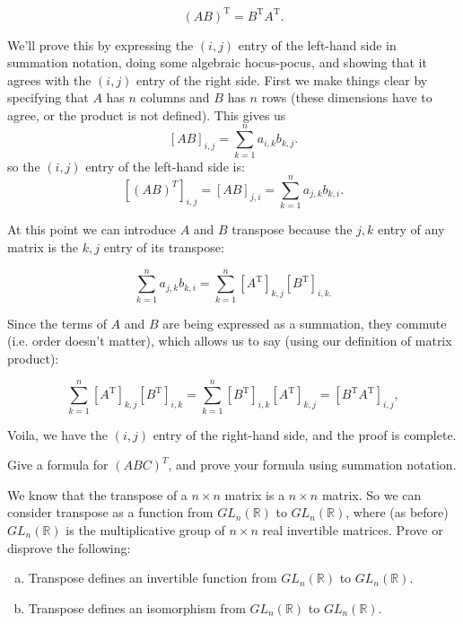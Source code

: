 \[ \left( {A}{B} \right)^{\text{T}} = {B}^{\text{T}} {A}^{\text{T}}. \]

We'll prove this by expressing the $(i,j)$ entry of the left-hand side in summation notation,  doing some algebraic hocus-pocus, and showing that it agrees with the $(i,j)$ entry of the right side.  First we make things clear by specifying that ${A}$ has $n$ columns and $B$ has $n$ rows (these dimensions have to agree, or the product is not defined). This gives us
\[ \left[ AB \right]_{i,j}= \sum_{k=1}^n a_{i,k} b_{k,j}. \]
so the $(i,j)$ entry of the left-hand side is:
 \[ \left[ (AB)^T \right]_{i,j} = \left[ AB \right]_{j,i} = \sum_{k=1}^n a_{j,k} b_{k,i}. \]

At this point we can introduce ${A}$ and ${B}$ transpose  because the $j,k$ entry of any matrix is the $k,j$ entry of its transpose:

\[  \sum_{k=1}^n a_{j,k} b_{k,i} =  \sum_{k=1}^n \left[A^{\text{T}}\right]_{k,j} \left[B^{\text{T}}\right]_{i,k.} \]

Since the terms of ${A}$ and ${B}$ are being expressed as a summation, they commute (i.e. order doesn't matter), which allows us to say (using our definition of matrix product):

\[ \sum_{k=1}^n \left[A^{\text{T}}\right]_{k,j} \left[B^{\text{T}}\right]_{i,k} = \sum_{k=1}^n \left[B^{\text{T}}\right]_{i,k}\left[A^{\text{T}}\right]_{k,j} = \left[ {B}^{\text{T}}{A}^{\text{T}} \right]_{i,j}, \]

Voila, we have the $(i,j)$ entry of the right-hand side, and the proof is complete.



\begin{exercise}{}
Give a formula for $(ABC)^T$, and prove your formula using summation notation.
\end{exercise}

\begin{exercise}{}
We know that the transpose of a $n \times n$ matrix is a $n \times n$ matrix.  So we can consider transpose as a function from $GL_n(\mathbb{R})$ to $GL_n(\mathbb{R})$, where (as before)  $GL_n(\mathbb{R})$  is the multiplicative group of $n \times n$ real invertible matrices. Prove or disprove the following:
\begin{enumerate}[(a)]
\item
Transpose defines an invertible function from $GL_n(\mathbb{R})$ to $GL_n(\mathbb{R})$.
\item
Transpose defines an isomorphism from $GL_n(\mathbb{R})$ to $GL_n(\mathbb{R})$.
\end{enumerate}
\end{exercise}

